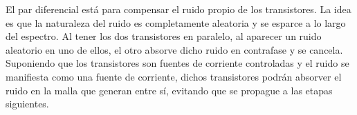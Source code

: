 
	El par diferencial está para compensar el ruido propio de los transistores. La idea es que la naturaleza del ruido es completamente aleatoria y se esparce a lo largo del espectro. Al tener los dos transistores en paralelo, al aparecer un ruido aleatorio en uno de ellos, el otro absorve dicho ruido en contrafase y se cancela. \\

	Suponiendo que los transistores son fuentes de corriente controladas y el ruido se manifiesta como una fuente de corriente, dichos transistores podrán absorver el ruido en la malla que generan entre sí, evitando que se propague a las etapas siguientes.
